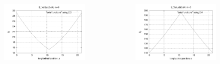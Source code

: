 \documentclass[t]{beamer}
\begin{document}
\begin{frame}{}
\begin{columns}
\begin{column}[t]{0.45\linewidth}
%
\begin{figure}[h]
\centering
\includegraphics[scale=0.48]{ETEAPOT_ValLeb2-sl4betax.pdf}
\end{figure}
\end{column}
%
\begin{column}[t]{0.45\linewidth}
\begin{figure}[h]
\centering
\includegraphics[scale=0.48]{ETEAPOT_ValLeb2-sl4betay.pdf}
\end{figure}
\end{column}
\end{columns}
\end{frame}
\end{document}
